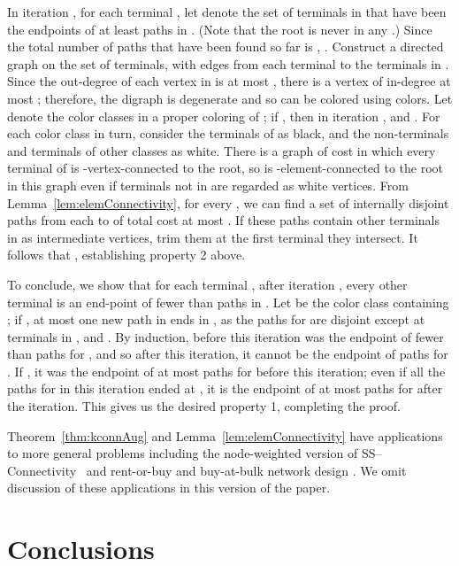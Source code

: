 \documentclass[11pt]{article}
\newcommand{\sskconn}{{\sc SS--Connectivity}}
\newenvironment{proofof}[1]{\smallskip\noindent{\bf Proof of #1:}}{\hspace*{\fill}\par}
\begin{document}
\begin{proofof}{Theorem~\ref{thm:kconnAug}}
  In iteration , for each terminal , let  denote the
  set of terminals in  that have been the endpoints of at least
   paths in . (Note
  that the root  is never in any .) Since the total
  number of paths that have been found so far is ,
  . Construct a directed graph  on the set of
  terminals, with edges from each terminal  to the terminals in
  . Since the out-degree of each vertex in  is at most
  , there is a vertex of in-degree at most ; therefore, the
  digraph  is  degenerate and so can be colored using 
  colors. Let  denote the color classes in
  a proper coloring of ; if , then in iteration
  ,  and . For
  each color class  in turn, consider the terminals of  as
  black, and the non-terminals and terminals of other classes as
  white. There is a graph of cost  in which every terminal of
   is -vertex-connected to the root, so  is
  -element-connected to the root in this graph even if terminals
  not in  are regarded as white vertices. From
  Lemma~\ref{lem:elemConnectivity}, for every , we can find a set
  of internally disjoint paths from each  to  of total cost at most . If these paths contain
  other terminals in  as intermediate vertices, trim them at
  the first terminal they intersect. It follows that , establishing property 2
  above.

  To conclude, we show that for each terminal , after iteration
  , every other terminal is an end-point of fewer than 
  paths in . Let  be the color
  class containing ; if , at most one new path
  in  ends in , as the paths for  are disjoint
  except at terminals in , and . By induction, before
  this iteration  was the endpoint of fewer than 
  paths for , and so after this iteration, it cannot be the
  endpoint of  paths for . If , it was
  the endpoint of at most  paths for  before this
  iteration; even if all the  paths for  in this iteration ended
  at , it is the endpoint of at most  paths for  after
  the iteration. This gives us the desired property 1, completing the
  proof.
\end{proofof}

Theorem~\ref{thm:kconnAug} and Lemma~\ref{lem:elemConnectivity} have
applications to more general problems including the node-weighted
version of \sskconn\ \cite{ChuzhoyK08} and rent-or-buy and buy-at-bulk
network design \cite{ChekuriK08}. We omit discussion of these
applications in this version of the paper.

\section{Conclusions}
\end{document}

